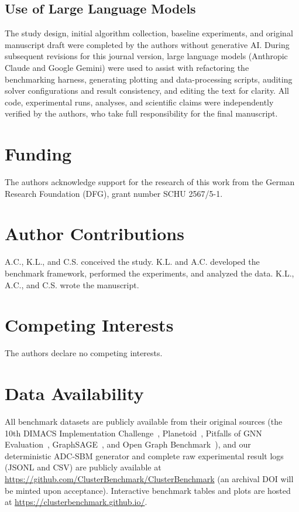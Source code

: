 \documentclass[11pt,a4paper]{article}
\begin{document}
\subsection{Use of Large Language Models}

The study design, initial algorithm collection, baseline experiments, and original manuscript draft were completed by the authors without generative AI. During subsequent revisions for this journal version, large language models (Anthropic Claude and Google Gemini) were used to assist with refactoring the benchmarking harness, generating plotting and data-processing scripts, auditing solver configurations and result consistency, and editing the text for clarity. All code, experimental runs, analyses, and scientific claims were independently verified by the authors, who take full responsibility for the final manuscript.

\section*{Funding}
The authors acknowledge support for the research of this work from the German Research Foundation (DFG), grant number SCHU 2567/5-1.

\section*{Author Contributions}
A.C., K.L., and C.S. conceived the study. K.L. and A.C. developed the benchmark framework, performed the experiments, and analyzed the data. K.L., A.C., and C.S. wrote the manuscript.

\section*{Competing Interests}
The authors declare no competing interests.

\section*{Data Availability}
All benchmark datasets are publicly available from their original sources (the 10th DIMACS Implementation Challenge~\cite{dimacschallengegraphpartandcluster}, Planetoid~\cite{yang2016revisiting}, Pitfalls of GNN Evaluation~\cite{shchur2018pitfalls}, GraphSAGE~\cite{hamilton2017inductive}, and Open Graph Benchmark~\cite{hu2020open}), and our deterministic ADC-SBM generator and complete raw experimental result logs (JSONL and CSV) are publicly available at \url{https://github.com/ClusterBenchmark/ClusterBenchmark} (an archival DOI will be minted upon acceptance). Interactive benchmark tables and plots are hosted at \url{https://clusterbenchmark.github.io/}.
\end{document}
